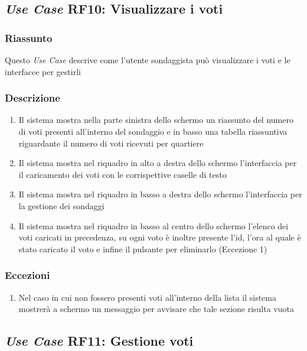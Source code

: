     \subsection{\textit{Use Case} RF10: Visualizzare i voti}
        \subsubsection{Riassunto}
            Questo \textit{Use Case} descrive come l'utente sondaggista può visualizzare i voti e le interfacce per gestirli
        \subsubsection{Descrizione}
            \begin{enumerate}
                \item Il sistema mostra nella parte sinistra dello schermo un riassunto del numero di voti presenti all'interno del sondaggio e in basso una tabella riassuntiva riguardante il numero di voti ricevuti per quartiere
                \item Il sistema mostra nel riquadro in alto a destra dello schermo l'interfaccia per il caricamento dei voti con le corrispettive caselle di testo
                \item Il sistema mostra nel riquadro in basso a destra dello schermo l'interfaccia per la gestione dei sondaggi
                \item Il sistema mostra nel riquadro in basso al centro dello schermo l'elenco dei voti caricati in precedenza, su ogni voto è inoltre presente l'id, l'ora al quale è stato caricato il voto e infine il pulsante per eliminarlo (Eccezione 1)
            \end{enumerate}
        \subsubsection{Eccezioni}
            \begin{enumerate}
                \item Nel caso in cui non fossero presenti voti all'interno della lista il sistema mostrerà a schermo un messaggio per avvisare che tale sezione risulta vuota
            \end{enumerate}

    \subsection{\textit{Use Case} RF11: Gestione voti}

